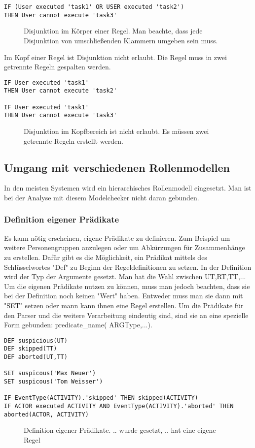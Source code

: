 \begin{verbatim}
IF (User executed 'task1' OR USER executed 'task2')
THEN User cannot execute 'task3'
\end{verbatim}
\begin{figure}[!h]
\caption{Disjunktion im Körper einer Regel. Man beachte, dass jede Disjunktion von umschließenden Klammern umgeben sein muss.}
\label{fig:disjunction1}
\end{figure}

Im Kopf einer Regel ist Disjunktion nicht erlaubt. Die Regel muss in zwei getrennte Regeln gespalten werden.

\begin{verbatim}
IF User executed 'task1'
THEN User cannot execute 'task2'

IF User executed 'task1'
THEN User cannot execute 'task3'
\end{verbatim}
\begin{figure}[!h]
\caption{Disjunktion im Kopfbereich ist nicht erlaubt. Es müssen zwei getrennte Regeln erstellt werden.}
\label{fig:disjunction2}
\end{figure}

\subsection{Umgang mit verschiedenen Rollenmodellen}
In den meisten Systemen wird ein hierarchisches Rollenmodell eingesetzt. Man ist bei der Analyse mit diesem Modelchecker nicht daran gebunden.


\subsubsection{Definition eigener Prädikate}
Es kann nötig erscheinen, eigene Prädikate zu definieren. Zum Beispiel um weitere Personengruppen anzulegen oder um Abkürzungen für Zusammenhänge zu erstellen. Dafür gibt es die Möglichkeit, ein Prädikat mittels des Schlüsselwortes "Def" zu Beginn der Regeldefinitionen zu setzen. In der Definition wird der Typ der Argumente gesetzt. Man hat die Wahl zwischen UT,RT,TT,...
Um die eigenen Prädikate nutzen zu können, muss man jedoch beachten, dass sie bei der Definition noch keinen "Wert" haben. Entweder muss man sie dann mit "SET" setzen oder mann kann ihnen eine Regel erstellen. Um die Prädikate für den Parser und die weitere Verarbeitung eindeutig sind, sind sie an eine spezielle Form gebunden: predicate{\_}name( ARGType,...).

\begin{verbatim}
DEF suspicious(UT)
DEF skipped(TT)
DEF aborted(UT,TT)

SET suspicous('Max Neuer')
SET suspicous('Tom Weisser')

IF EventType(ACTIVITY).'skipped' THEN skipped(ACTIVITY)
IF ACTOR executed ACTIVITY AND EventType(ACTIVITY).'aborted' THEN aborted(ACTOR, ACTIVITY)
\end{verbatim}
\begin{figure}[!h]
\caption{Definition eigener Prädikate. .. wurde gesetzt, .. hat eine eigene Regel}
\label{fig:define}
\end{figure}

